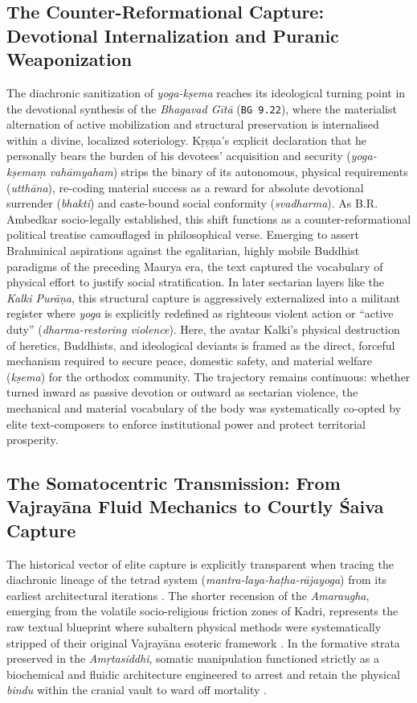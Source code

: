 \documentclass[11pt,letterpaper]{article}
\begin{document}
\subsection{The Counter-Reformational Capture: Devotional Internalization and Puranic Weaponization}
The diachronic sanitization of \textit{yoga-kṣema} reaches its ideological turning point in the devotional synthesis of the \textit{Bhagavad Gītā} (\texttt{BG 9.22}), where the materialist alternation of active mobilization and structural preservation is internalised within a divine, localized soteriology. Kṛṣṇa’s explicit declaration that he personally bears the burden of his devotees’ acquisition and security (\textit{yoga-kṣemaṃ vahāmyaham}) strips the binary of its autonomous, physical requirements (\textit{utthāna}), re-coding material success as a reward for absolute devotional surrender (\textit{bhakti}) and caste-bound social conformity (\textit{svadharma}). As B.R. Ambedkar socio-legally established, this shift functions as a counter-reformational political treatise camouflaged in philosophical verse. Emerging to assert Brahminical aspirations against the egalitarian, highly mobile Buddhist paradigms of the preceding Maurya era, the text captured the vocabulary of physical effort to justify social stratification. In later sectarian layers like the \textit{Kalki Purāṇa}, this structural capture is aggressively externalized into a militant register where \textit{yoga} is explicitly redefined as righteous violent action or ``active duty'' (\textit{dharma-restoring violence}). Here, the avatar Kalki’s physical destruction of heretics, Buddhists, and ideological deviants is framed as the direct, forceful mechanism required to secure peace, domestic safety, and material welfare (\textit{kṣema}) for the orthodox community. The trajectory remains continuous: whether turned inward as passive devotion or outward as sectarian violence, the mechanical and material vocabulary of the body was systematically co-opted by elite text-composers to enforce institutional power and protect territorial prosperity.

\subsection{The Somatocentric Transmission: From Vajrayāna Fluid Mechanics to Courtly Śaiva Capture}

The historical vector of elite capture is explicitly transparent when tracing the diachronic lineage of the tetrad system (\textit{mantra-laya-haṭha-rājayoga}) from its earliest architectural iterations \cite{Birch2024}. The shorter recension of the \textit{Amaraugha}, emerging from the volatile socio-religious friction zones of Kadri, represents the raw textual blueprint where subaltern physical methods were systematically stripped of their original Vajrayāna esoteric framework \cite{Birch2024}. In the formative strata preserved in the \textit{Amṛtasiddhi}, somatic manipulation functioned strictly as a biochemical and fluidic architecture engineered to arrest and retain the physical \textit{bindu} within the cranial vault to ward off mortality \cite{Birch2024}. 
\end{document}
